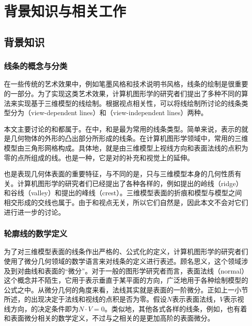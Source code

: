 \chapter{背景知识与相关工作}

\section{背景知识}

\subsection{线条的概念与分类}
\label{sec:diff_geo}

在一些传统的艺术效果中，例如笔墨风格和技术说明书风格，线条的绘制是很重要的一部分。为了实现这类艺术效果，计算机图形学的研究者们提出了多种不同的算法来实现基于三维模型的线绘制。根据视点相关性，可以将线绘制所讨论的线条类型分为\vdl{}（view-dependent lines）和\vidl{}（view-independent lines）两种。

本文主要讨论的\con{}和\scon{}都属于\vdl{}。在\vdl{}中，\con{}和\scon{}是最为常用的线条类型。简单来说，\con{}表示的就是几何物体的外形的凸出部分所形成的线条。在计算机图形学领域中，常用的三维模型由三角形网格构成。具体地，\con{}就是由三维模型上视线方向和表面法线的点积为零的点所组成的线。\scon{}也是一种\vdl{}，它是对\con{}的补充和视觉上的延伸。

\vidl{}也是表现几何体表面的重要特征，与\vdl{}不同的是，\vidl{}只与三维模型本身的几何性质有关。计算机图形学的研究者们已经提出了各种各样的\vdl{}，例如\citeauthor{ohtake2004ridge}提出的\cite{ohtake2004ridge}岭线（ridge）和谷线（valley）和\citeauthor{yoshizawa2005fast}提出的峰线（crest）\cite{yoshizawa2005fast}。三维模型表面的折痕和模型与模型之间相交形成的交线也属于\vidl{}。由于\vidl{}和视点无关，所以它们自然是\stc{}，因此本文不会对它们进行进一步的讨论。

\subsection{轮廓线的数学定义}

为了对三维模型表面的线条作出严格的、公式化的定义，计算机图形学的研究者们使用了微分几何领域的数学语言来对线条的定义进行表述。顾名思义，这个领域涉及到对曲线和表面的“微分”。对于一般的图形学研究者而言，表面法线（normal）这个概念并不陌生，它用于表示垂直于某平面的方向，广泛地用于各种绘制模型的公式之中。从微分几何的角度来看，法线其实就是表面的一阶微分。正如上一小节所述，\con{}的出现决定于法线和视线的点积是否为零。假设$N$表示表面法线，$V$表示视线方向，\con{}的决定条件即为$N\cdot{V} = 0$。类似地，其他各式各样的线条，例如\scon{}，也有着和表面微分相关的数学定义，不过与之相关的是更加高阶的表面微分。

